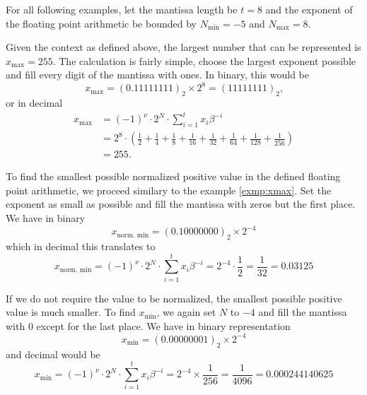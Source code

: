 For all following examples, let the mantissa length be \(t = 8\) and the exponent of the floating point arithmetic be bounded by \(N_{\text{min}} = -5\) and \(N_{\text{max}} = 8\).
%
%
%
\begin{exmp} \label{exmp:xmax}
    Given the context as defined above, the largest number that can be represented is \(x_\text{max} = 255\). The calculation is fairly simple, choose the largest exponent possible and fill every digit of the mantissa with ones. In binary, this would be
    \begin{equation*}
        x_\text{max} = (0.11111111)_2 \times 2^8 = (11111111)_2 \text{,}
    \end{equation*}
    or in decimal
    \begin{align*}
        x_\text{max} &= (-1)^{\nu} \cdot 2^N \cdot \sum_{i=1}^{t}x_i \beta^{-i}\\
        &= 2^8 \cdot \left(\frac{1}{2} + \frac{1}{4} + \frac{1}{8} + \frac{1}{16} + \frac{1}{32} + \frac{1}{64} + \frac{1}{128} + \frac{1}{256}\right) \\
        &= 255 \text{.}
    \end{align*}
\end{exmp}
%
%
\begin{exmp}
    To find the smallest possible normalized positive value in the defined floating point arithmetic, we proceed similary to the example \ref{exmp:xmax}. Set the exponent as small as possible and fill the mantissa with zeros but the first place. We have in binary
    \begin{equation*}
        x_\text{norm. min} = (0.10000000)_2 \times 2^{-4}
    \end{equation*}
    which in decimal this translates to
    \begin{equation*}
        x_\text{norm. min} = (-1)^{\nu} \cdot 2^N \cdot \sum_{i=1}^{t}x_i \beta^{-i} = 2^{-4} \cdot \frac{1}{2} = \frac{1}{32} = 0.03125
    \end{equation*}
\end{exmp}
%
%
\begin{exmp}
    If we do not require the value to be normalized, the smallest possible positive value is much smaller. To find \(x_\text{min}\), we again set \(N\) to \(-4\) and fill the mantissa with \(0\) except for the last place. We have in binary representation
    \begin{equation*}
        x_\text{min} = (0.00000001)_2 \times 2^{-4}
    \end{equation*}
    and decimal would be
    \begin{equation*}
        x_\text{min} = (-1)^{\nu} \cdot 2^N \cdot \sum_{i=1}^{t}x_i \beta^{-i} = 2^{-4} \times \frac{1}{256} = \frac{1}{4096} = 0.000244140625
    \end{equation*}
\end{exmp}
